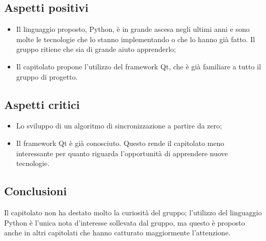 \subsection{Aspetti positivi}
\begin{itemize}
\item Il linguaggio proposto, Python, è in grande ascesa negli ultimi anni e sono molte le tecnologie che lo stanno implementando o che lo hanno già fatto. Il gruppo ritiene che sia di grande aiuto apprenderlo;
\item Il capitolato propone l'utilizzo del framework Qt, che è già familiare a tutto il gruppo di progetto.
\end{itemize}

\subsection{Aspetti critici}
\begin{itemize}
\item Lo sviluppo di un algoritmo di sincronizzazione a partire da zero;
\item Il framework Qt è già conosciuto. Questo rende il capitolato meno interessante per quanto riguarda l'opportunità di apprendere nuove tecnologie.
\end{itemize}

\subsection{Conclusioni}
Il capitolato non ha destato molto la curiosità del gruppo; l'utilizzo del linguaggio Python è l'unica nota d'interesse sollevata dal gruppo, ma questo è proposto anche in altri capitolati che hanno catturato maggiormente l'attenzione.
